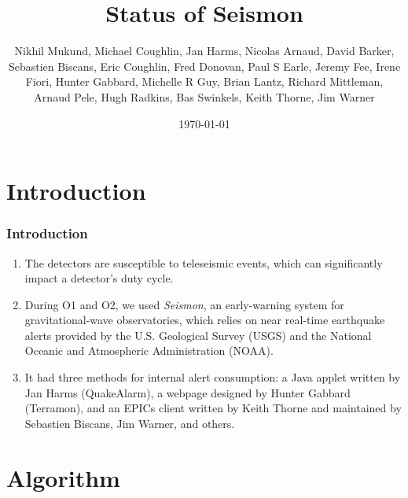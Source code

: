 \documentclass[ignorenonframetext,t,10pt]{beamer}
\title[Status of Seismon]{Status of Seismon}
\author[N.~Mukund, M.~Coughlin]{Nikhil Mukund, Michael Coughlin, Jan Harms, Nicolas Arnaud, David Barker, Sebastien Biscans, Eric Coughlin, Fred Donovan, Paul S Earle, Jeremy Fee, Irene Fiori, Hunter Gabbard, Michelle R Guy, Brian Lantz, Richard Mittleman, Arnaud Pele, Hugh Radkins, Bas Swinkels, Keith Thorne, Jim Warner}
\date[]{\today}
\begin{document}
\maketitle

\begin{frame}
\titlepage
\end{frame}

\section{Introduction}

\begin{frame}
\frametitle{Introduction}

  \begin{enumerate}
  \item The detectors are susceptible to teleseismic events, which can significantly impact a detector's duty cycle. 
  \item During O1 and O2, we used \emph{Seismon}, an early-warning system for gravitational-wave observatories, which relies on near real-time earthquake alerts provided by the U.S. Geological Survey (USGS) and the National Oceanic and Atmospheric Administration (NOAA).
  \item It had three methods for internal alert consumption: a Java applet written by Jan Harms (QuakeAlarm), a webpage designed by Hunter Gabbard (Terramon), and an EPICs client written by Keith Thorne and maintained by Sebastien Biscans, Jim Warner, and others.
  \end{enumerate}
\end{frame}

\section{Algorithm}
\end{document}
